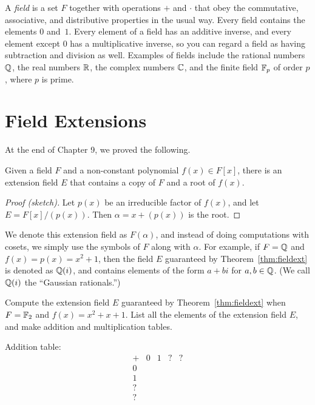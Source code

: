 A \textit{field} is a set $F$ together with operations $+$ and $\cdot$ that obey the commutative, associative, and distributive properties in the usual way. Every field contains the elements $0$ and~$1$. Every element of a field has an additive inverse, and every element except $0$ has a multiplicative inverse, so you can regard a field as having subtraction and division as well. Examples of fields include the rational numbers $\mathbb{Q}$, the real numbers $\mathbb{R}$, the complex numbers $\mathbb{C}$, and the finite field $\mathbb{F}_p$ of order $p$, where $p$ is prime.

\section{Field Extensions}

At the end of Chapter 9, we proved the following.

\begin{theorem}\label{thm:fieldext}
    Given a field $F$ and a non-constant polynomial $f(x)
    \in F[x]$, there is an extension field $E$ that contains a copy of $F$ and a root of $f(x)$.
\end{theorem}

\begin{proof}[Proof (sketch)]
    Let $p(x)$ be an irreducible factor of $f(x)$, and let $E=F[x]/(p(x))$. Then  $\alpha = x+(p(x))$ is the root.
\end{proof}

We denote this extension field as $F(\alpha)$, and instead of doing computations with cosets, we simply use the symbols of $F$ along with $\alpha$. For example, if $F = \mathbb{Q}$ and $f(x)=p(x)=x^2+1$, then the field $E$ guaranteed by Theorem~\ref{thm:fieldext} is denoted as $\mathbb{Q}(i)$, and contains elements of the form $a+bi$ for $a,b\in \mathbb{Q}$. (We call $\mathbb{Q}(i)$ the ``Gaussian rationals.'')

\begin{problem}
    Compute the extension field $E$ guaranteed by Theorem~\ref{thm:fieldext} when $F = \mathbb{F}_2$ and $f(x)=x^2+x+1$. List all the elements of the extension field $E$, and make addition and multiplication tables.
\end{problem}



Addition table:
\[
\begin{array}{c|cccc}
+   & 0   & 1  & ? & ? \\ \hline
0   &     &    &   &   \\
1   &     &    &   &   \\
?   &     &    &   &   \\
?   &     &    &   &   \\
\end{array}
\]

